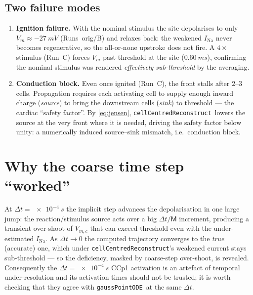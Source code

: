 \documentclass[11pt,a4paper]{article}
\newcommand{\Vm}{V_{m}}
\newcommand{\code}[1]{\texttt{\small #1}}
\newcommand{\gpode}{\code{gaussPointODE}}
\newcommand{\ccrec}{\code{cellCentredReconstruct}}
\newcommand{\Vbarc}{\overline{V}_{m,c}}
\begin{document}
\subsection{Two failure modes}

\begin{enumerate}[leftmargin=1.4em,nosep]
  \item \textbf{Ignition failure.} With the nominal stimulus the site depolarises
    to only $\Vm\approx\SI{-27}{mV}$ (Runs~orig/B) and relaxes back: the weakened
    $I_{\mathrm{Na}}$ never becomes regenerative, so the all-or-none upstroke does
    not fire. A $4\times$ stimulus (Run~C) forces $\Vm$ past threshold at the site
    ($\SI{0.60}{ms}$), confirming the nominal stimulus was rendered
    \emph{effectively sub-threshold} by the averaging.
  \item \textbf{Conduction block.} Even once ignited (Run~C), the front stalls
    after $2$--$3$ cells. Propagation requires each activating cell to supply
    enough inward charge (\emph{source}) to bring the downstream cells
    (\emph{sink}) to threshold --- the cardiac ``safety factor''. By
    \eqref{eq:jensen}, \ccrec\ lowers the source at the very front where it is
    needed, driving the safety factor below unity: a numerically induced
    source--sink mismatch, i.e.\ conduction block.
\end{enumerate}

\section{Why the coarse time step ``worked''}

At $\Delta t=\SI{e-4}{s}$ the implicit step advances the depolarisation in one
large jump: the reaction/stimulus source acts over a big $\Delta t/\mathsf{M}$
increment, producing a transient over-shoot of $\Vbarc$ that can exceed threshold
even with the under-estimated $I_{\mathrm{Na}}$. As $\Delta t\to0$ the computed
trajectory converges to the \emph{true} (accurate) one, which under \ccrec's
weakened current stays sub-threshold --- so the deficiency, masked by
coarse-step over-shoot, is revealed. Consequently the $\Delta t=\SI{e-4}{s}$
CCp1 activation is an artefact of temporal under-resolution and its activation
times should not be trusted; it is worth checking that they agree with \gpode\ at
the same $\Delta t$.
\end{document}
